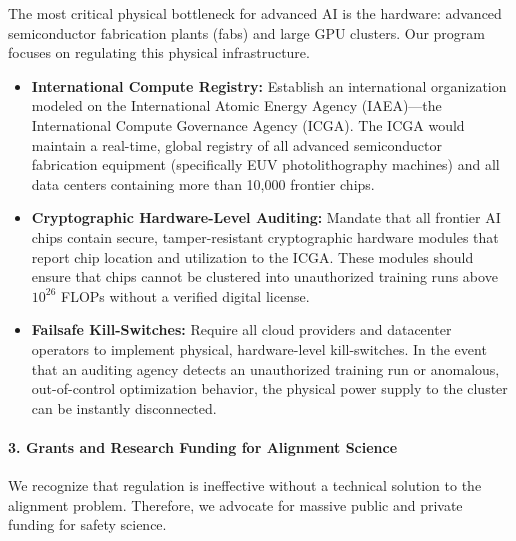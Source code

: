 The most critical physical bottleneck for advanced AI is the hardware:
advanced semiconductor fabrication plants (fabs) and large GPU clusters.
Our program focuses on regulating this physical infrastructure.

\begin{itemize}
\tightlist
\item
  \textbf{International Compute Registry:} Establish an international
  organization modeled on the International Atomic Energy Agency
  (IAEA)---the International Compute Governance Agency (ICGA). The ICGA
  would maintain a real-time, global registry of all advanced
  semiconductor fabrication equipment (specifically EUV photolithography
  machines) and all data centers containing more than 10,000 frontier
  chips.
\item
  \textbf{Cryptographic Hardware-Level Auditing:} Mandate that all
  frontier AI chips contain secure, tamper-resistant cryptographic
  hardware modules that report chip location and utilization to the
  ICGA. These modules should ensure that chips cannot be clustered into
  unauthorized training runs above \(10^{26}\) FLOPs without a verified
  digital license.
\item
  \textbf{Failsafe Kill-Switches:} Require all cloud providers and
  datacenter operators to implement physical, hardware-level
  kill-switches. In the event that an auditing agency detects an
  unauthorized training run or anomalous, out-of-control optimization
  behavior, the physical power supply to the cluster can be instantly
  disconnected.
\end{itemize}

\paragraph{3. Grants and Research Funding for Alignment
Science}\label{grants-and-research-funding-for-alignment-science}

We recognize that regulation is ineffective without a technical solution
to the alignment problem. Therefore, we advocate for massive public and
private funding for safety science.

